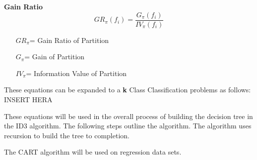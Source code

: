 \documentclass[twoside,11pt]{article}
\begin{document}
\textbf{Gain Ratio}
\begin{equation}
	GR_\pi(f_i)  = \frac{G_\pi(f_i)}{IV_\pi(f_i)}
\end{equation}
\begin{itemize}
	\item[$GR_\pi$=] Gain Ratio of Partition
	\item[$G_\pi$=] Gain of Partition
	\item[$IV_\pi$=] Information Value of Partition
\end{itemize}

These equations can be expanded to a \textbf{k} Class Classification problems as follows:\newline
INSERT HERA\newline

These equations will be used in the overall process of building the decision tree in the ID3 algorithm. The following steps outline the algorithm. The algorithm uses recursion to build the tree to completion. 




\newpage
The CART algorithm will be used on regression data sets. 
\end{document}
